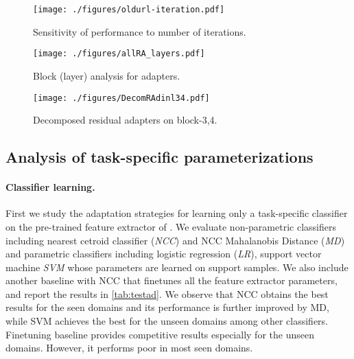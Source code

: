 \begin{figure*}[ht]
\RawFloats
\noindent\begin{minipage}[t]{0.32\textwidth}
\begin{center}
\texttt{[image: ./figures/oldurl-iteration.pdf]}
\end{center}
\vspace{-0.3in}
\caption{Sensitivity of performance to number of iterations.}
\label{fig:urlstab}
\end{minipage} \hfill
\begin{minipage}[t]{0.32\textwidth}
\begin{center}
\texttt{[image: ./figures/allRA\_layers.pdf]}
\end{center}
\vspace{-0.3in}
\caption{Block (layer) analysis for adapters.}
\label{fig:urllayers}
\end{minipage} \hfill
\begin{minipage}[t]{0.32\textwidth}
\begin{center}
\texttt{[image: ./figures/DecomRAdinl34.pdf]}
\end{center}
\vspace{-0.3in}
\caption{Decomposed residual adapters on block-3,4.}
\label{fig:urldecoml34}
\end{minipage} \hfill
\vspace{-0.35cm}
\end{figure*}

\subsection{Analysis of task-specific parameterizations}
\label{sec:analysis}

\paragraph{Classifier learning.}
First we study the adaptation strategies for learning only a task-specific classifier on the pre-trained feature extractor of \cite{li2021universal}.
We evaluate non-parametric classifiers including nearest cetroid classifier (\emph{NCC}) and NCC Mahalanobis Distance (\emph{MD}) and parametric classifiers including logistic regression (\emph{LR}), support vector machine \emph{SVM} whose parameters are learned on support samples.
We also include another baseline with NCC that finetunes all the feature extractor parameters, and report the results in \cref{tab:testad}.
We observe that NCC obtains the best results for the seen domains and its performance is further improved by MD, while SVM achieves the best for the unseen domains among other classifiers. 
Finetuning baseline provides competitive results especially for the unseen domains. However, it performs poor in most seen domains.

